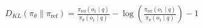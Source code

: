 \documentclass[preview]{standalone}
\begin{document}
\begin{align*}
D_{KL}(\pi_\theta \parallel \pi_{\text{ref}}) = \frac{\pi_{\text{ref}}(o_1 \mid q)}{\pi_\theta(o_1 \mid q)} - \log\left(\frac{\pi_{\text{ref}}(o_1 \mid q)}{\pi_\theta(o_1 \mid q)}\right) - 1
\end{align*}
\end{document}
